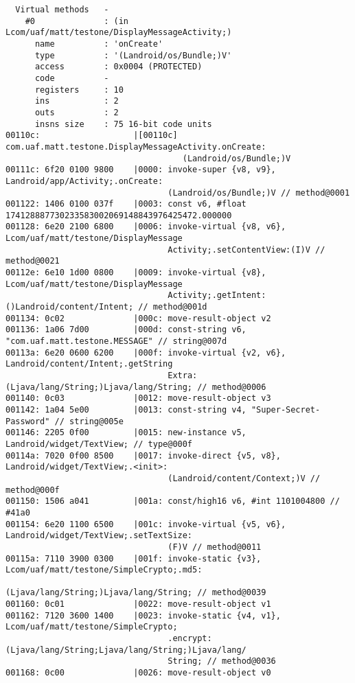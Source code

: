 \begin{lstlisting}
  Virtual methods   -
    #0              : (in Lcom/uaf/matt/testone/DisplayMessageActivity;)
      name          : 'onCreate'
      type          : '(Landroid/os/Bundle;)V'
      access        : 0x0004 (PROTECTED)
      code          -
      registers     : 10
      ins           : 2
      outs          : 2
      insns size    : 75 16-bit code units
00110c:                   |[00110c] com.uaf.matt.testone.DisplayMessageActivity.onCreate:
                                    (Landroid/os/Bundle;)V
00111c: 6f20 0100 9800    |0000: invoke-super {v8, v9}, Landroid/app/Activity;.onCreate:
                                 (Landroid/os/Bundle;)V // method@0001
001122: 1406 0100 037f    |0003: const v6, #float 174128887730233583002069148843976425472.000000
001128: 6e20 2100 6800    |0006: invoke-virtual {v8, v6}, Lcom/uaf/matt/testone/DisplayMessage
                                 Activity;.setContentView:(I)V // method@0021
00112e: 6e10 1d00 0800    |0009: invoke-virtual {v8}, Lcom/uaf/matt/testone/DisplayMessage
                                 Activity;.getIntent:()Landroid/content/Intent; // method@001d
001134: 0c02              |000c: move-result-object v2
001136: 1a06 7d00         |000d: const-string v6, "com.uaf.matt.testone.MESSAGE" // string@007d
00113a: 6e20 0600 6200    |000f: invoke-virtual {v2, v6}, Landroid/content/Intent;.getString
                                 Extra:(Ljava/lang/String;)Ljava/lang/String; // method@0006
001140: 0c03              |0012: move-result-object v3
001142: 1a04 5e00         |0013: const-string v4, "Super-Secret-Password" // string@005e
001146: 2205 0f00         |0015: new-instance v5, Landroid/widget/TextView; // type@000f
00114a: 7020 0f00 8500    |0017: invoke-direct {v5, v8}, Landroid/widget/TextView;.<init>:
                                 (Landroid/content/Context;)V // method@000f
001150: 1506 a041         |001a: const/high16 v6, #int 1101004800 // #41a0
001154: 6e20 1100 6500    |001c: invoke-virtual {v5, v6}, Landroid/widget/TextView;.setTextSize:
                                 (F)V // method@0011
00115a: 7110 3900 0300    |001f: invoke-static {v3}, Lcom/uaf/matt/testone/SimpleCrypto;.md5:
                                 (Ljava/lang/String;)Ljava/lang/String; // method@0039
001160: 0c01              |0022: move-result-object v1
001162: 7120 3600 1400    |0023: invoke-static {v4, v1}, Lcom/uaf/matt/testone/SimpleCrypto;
                                 .encrypt:(Ljava/lang/String;Ljava/lang/String;)Ljava/lang/
                                 String; // method@0036
001168: 0c00              |0026: move-result-object v0

\end{lstlisting}
